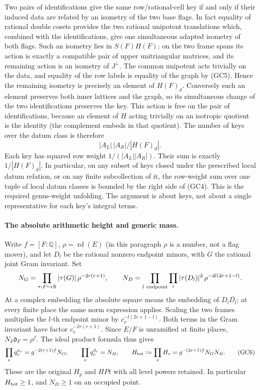 Two pairs of identifications give the same row/rational-cell
key if and only if their induced data are related by an
isometry of the two base flags. In fact equality of rational
double cosets provides the two rational unipotent
translations which, combined with the identifications, give
one simultaneous adapted isometry of both flags. Such an
isometry lies in \(S(F)H(F)\): on the two frame spans its
action is exactly a compatible pair of upper unitriangular
matrices, and its remaining action is an isometry of
\(J^\perp\). The common unipotent acts trivially on the
data, and equality of the row labels is equality of the
graph by (GC5). Hence the remaining isometry is precisely an
element of \(H(F)_d\). Conversely such an element preserves
both inner lattices and the graph, so its simultaneous change
of the two identifications preserves the key. This action is
free on the pair of identifications, because an element of
\(H\) acting trivially on an isotropic quotient is the
identity (the complement embeds in that quotient).
The number of keys over the datum class is therefore
\[
          |A_L|\,|A_R|/|H(F)_d|.
\]
Each key has squared row weight \(1/(|A_L||A_R|)\). Their
sum is exactly \(1/|H(F)_d|\). In particular, on any subset
of keys closed under the prescribed local datum relation, or
on any finite subcollection of it, the row-weight sum over
one tuple of local datum classes is bounded by the right side
of (GC4). This is the required genus-weight unfolding.
The argument is about keys, not about a single representative
for each key's integral terms.

\paragraph{The absolute arithmetic height and generic mass.}
Write \(f=[F:\mathbb Q]\), \(\rho=\operatorname{rd}(E)\)
(in this paragraph \(\rho\) is a number, not a flag mover),
and let \(D_l\) be the rational nonzero endpoint minors, with
\(G\) the rational joint Gram invariant. Set
\[
 N_G=\prod_{\tau:F\hookrightarrow\mathbb R}
                    |\tau(G)|\,\rho^{-2r(r+1)},\qquad
 N_D=\prod_{l\ {\rm endpoint}}\prod_\tau
             |\tau(D_l)|^2\,\rho^{-2l(2r+1-l)} .
\]
At a complex embedding the absolute square means the
embedding of \(D_l\overline{D_l}\); at every finite place
the same norm expression applies. Scaling the two frames
multiplies the \(l\)-th endpoint minor by
\(c_v^{-l(2r+1-l)}\). Both terms in the Gram invariant have
factor \(c_v^{-2r(r+1)}\). Since \(E/F\) is unramified at
finite places, \(N_F\mathfrak d_F=\rho^f\).
The ideal product formula thus gives
\[
 \prod_v q_v^{a_v}=g^{-2(r+1)f}N_G,\qquad
 \prod_v q_v^{d_v}=N_D,\qquad
 H_{\rm tot}:=\prod_vH_v=g^{-(2r+1)f}N_GN_D.
 \tag{GC6}
\]
These are the original \(H_p\) and \(HPt\) with all level
powers retained. In particular \(H_{\rm tot}\ge1\), and
\(N_D\ge1\) on an occupied point.

